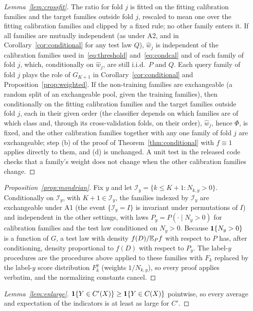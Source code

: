 \begin{proof}[Lemma~\ref{lem:crossfit}]
The ratio for fold $j$ is fitted on the fitting calibration families and the target families outside fold $j$, rescaled to mean one over the fitting calibration families and clipped by a fixed rule; no other family enters it. If all families are mutually independent (as under A2, and in Corollary~\ref{cor:conditional} for any test law $Q$), $\hat w_j$ is independent of the calibration families used in~\eqref{eq:threshold} and~\eqref{eq:condcal} and of each family of fold $j$, which, conditionally on $\hat w_j$, are still i.i.d.\ $P$ and $Q$. Each query family of fold $j$ plays the role of $G_{K+1}$ in Corollary~\ref{cor:conditional} and Proposition~\ref{prop:weighted}. If the non-training families are exchangeable (a random split of an exchangeable pool, given the training families), then conditionally on the fitting calibration families and the target families outside fold $j$, each in their given order (the classifier depends on which families are of which class and, through its cross-validation folds, on their order), $\hat w_j$, hence $\Phi$, is fixed, and the other calibration families together with any one family of fold $j$ are exchangeable; step (b) of the proof of Theorem~\ref{thm:conditional} with $f\equiv1$ applies directly to them, and (d) is unchanged. A unit test in the released code checks that a family's weight does not change when the other calibration families change.
\end{proof}

\begin{proof}[Proposition~\ref{prop:mondrian}]
Fix $y$ and let $\mathcal{I}_y=\{k\le K+1:N_{k,y}>0\}$. Conditionally on $\mathcal{I}_y$, with $K+1\in\mathcal{I}_y$, the families indexed by $\mathcal{I}_y$ are exchangeable under A1 (the event $\{\mathcal{I}_y=I\}$ is invariant under permutations of $I$) and independent in the other settings, with laws $P_y=P(\cdot\mid N_y>0)$ for calibration families and the test law conditioned on $N_y>0$. Because $\mathbf{1}\{N_y>0\}$ is a function of $G$, a test law with density $f(D)/\mathbb{E}_Pf$ with respect to $P$ has, after conditioning, density proportional to $f(D)$ with respect to $P_y$. The label-$y$ procedures are the procedures above applied to these families with $F_k$ replaced by the label-$y$ score distribution $F_k^y$ (weights $1/N_{k,y}$), so every proof applies verbatim, and the normalizing constants cancel.
\end{proof}

\begin{proof}[Lemma~\ref{lem:enlarge}]
$\mathbf{1}\{Y\in C'(X)\}\ge\mathbf{1}\{Y\in C(X)\}$ pointwise, so every average and expectation of the indicators is at least as large for $C'$.
\end{proof}

